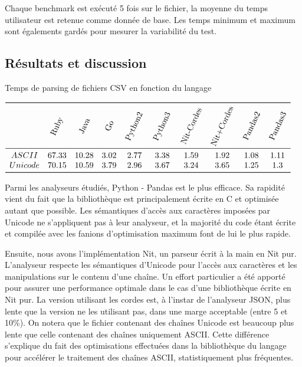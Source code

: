 Chaque benchmark est exécuté 5 fois sur le fichier, la moyenne du temps utilisateur est retenue comme donnée de base.
Les temps minimum et maximum sont égalements gardés pour mesurer la variabilité du test.

\subsection{Résultats et discussion}

\begin{table}
	\caption{\label{csv_numbers}Temps de parsing de fichiers CSV en fonction du langage}
	\centering
	$\begin{array}{ *{10}{c} }
		\toprule
		& \rotatebox[]{65}{Ruby} & \rotatebox[]{65}{Java} & \rotatebox[]{65}{Go} & \rotatebox[]{65}{Python2} & \rotatebox[]{65}{Python3} & \rotatebox[]{65}{Nit-Cordes} & \rotatebox[]{65}{Nit+Cordes} & \rotatebox[]{65}{Pandas2} & \rotatebox[]{65}{Pandas3}\\
		\midrule
		ASCII & 67.33 & 10.28 & 3.02 & 2.77 & 3.38 & 1.59 & 1.92 & 1.08 & 1.11\\
		Unicode & 70.15 & 10.59 & 3.79 & 2.96 & 3.67 & 3.24 & 3.65 & 1.25 & 1.3\\
		\bottomrule
	\end{array}$
\end{table}


Parmi les analyseurs étudiés, Python - Pandas est le plus efficace.
Sa rapidité vient du fait que la bibliothèque est principalement écrite en C et optimisée autant
que possible.
Les sémantiques d'accès aux caractères imposées par Unicode ne s'appliquent pas à leur analyseur, et la majorité
du code étant écrite et compilée avec les fanions d'optimisation maximum font de lui le plus rapide.

Ensuite, nous avons l'implémentation Nit, un parseur écrit à la main en Nit pur.
L'analyseur respecte les sémantiques d'Unicode pour l'accès aux caractères et les manipulations sur le contenu
d'une chaîne.
Un effort particulier a été apporté pour assurer une performance optimale dans le cas d'une bibliothèque écrite
en Nit pur.
La version utilisant les cordes est, à l'instar de l'analyseur JSON, plus lente que la version ne les utilisant pas,
dans une marge acceptable (entre 5 et 10\%).
On notera que le fichier contenant des chaînes Unicode est beaucoup plus lente que celle contenant des chaînes uniquement
ASCII.
Cette différence s'explique du fait des optimisations effectuées dans la bibliothèque du langage pour accélérer le traitement
des chaînes ASCII, statistiquement plus fréquentes.

